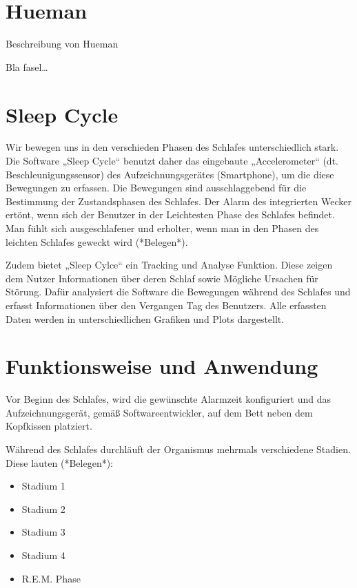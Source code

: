 \section{Hueman}
\label{ch:Apps:sec:Hueman}

Beschreibung von Hueman

Bla fasel\ldots

\section{Sleep Cycle}
\label{ch:Apps:sec:SleepCycle}

Wir bewegen uns in den verschieden Phasen des Schlafes unterschiedlich stark. Die Software „Sleep Cycle“ benutzt daher das eingebaute „Accelerometer“ (dt. Beschleunigungssensor) des Aufzeichnungsgerätes (Smartphone), um die diese Bewegungen zu erfassen. Die Bewegungen sind ausschlaggebend für die Bestimmung der Zustandsphasen des Schlafes. Der Alarm des integrierten Wecker ertönt, wenn sich der Benutzer in der Leichtesten Phase des Schlafes befindet. Man fühlt sich ausgeschlafener und erholter, wenn man in den Phasen des leichten Schlafes geweckt wird (*Belegen*). 

Zudem bietet „Sleep Cylce“ ein Tracking und Analyse Funktion. Diese zeigen dem Nutzer Informationen über deren Schlaf sowie Mögliche Ursachen für Störung. Dafür analysiert die Software die Bewegungen während des Schlafes und erfasst Informationen über den Vergangen Tag des Benutzers. Alle erfassten Daten werden in unterschiedlichen Grafiken und Plots dargestellt.

\section{Funktionsweise und Anwendung}

Vor Beginn des Schlafes, wird die gewünschte Alarmzeit konfiguriert und das Aufzeichnungsgerät, gemäß Softwareentwickler, auf dem Bett neben dem Kopfkissen platziert. 

Während des Schlafes durchläuft der Organismus mehrmals verschiedene Stadien. Diese lauten (*Belegen*):

\begin{itemize}
	\item Stadium 1
	\item Stadium 2
	\item Stadium 3
	\item Stadium 4
	\item R.E.M. Phase
\end{itemize}


